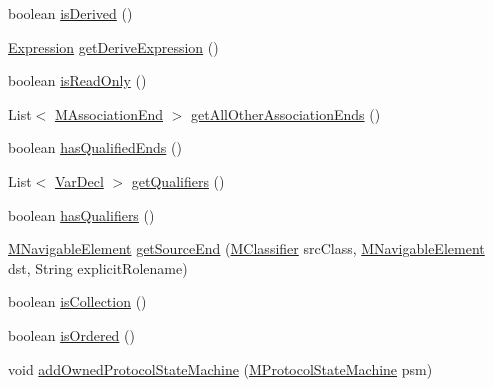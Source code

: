 \begin{DoxyCompactItemize}
boolean \hyperlink{classorg_1_1tzi_1_1use_1_1uml_1_1mm_1_1_m_association_class_impl_a62a7756bef1e61a1e354d73a60ba67e2}{is\-Derived} ()
\item 
\hyperlink{classorg_1_1tzi_1_1use_1_1uml_1_1ocl_1_1expr_1_1_expression}{Expression} \hyperlink{classorg_1_1tzi_1_1use_1_1uml_1_1mm_1_1_m_association_class_impl_adafb0cd12d54a13c79bc32deef41552b}{get\-Derive\-Expression} ()
\item 
boolean \hyperlink{classorg_1_1tzi_1_1use_1_1uml_1_1mm_1_1_m_association_class_impl_abb95bfabae3006d07e38d8c96f8c2c1b}{is\-Read\-Only} ()
\item 
List$<$ \hyperlink{classorg_1_1tzi_1_1use_1_1uml_1_1mm_1_1_m_association_end}{M\-Association\-End} $>$ \hyperlink{classorg_1_1tzi_1_1use_1_1uml_1_1mm_1_1_m_association_class_impl_a42ea6913ced3712538e8b2a394465974}{get\-All\-Other\-Association\-Ends} ()
\item 
boolean \hyperlink{classorg_1_1tzi_1_1use_1_1uml_1_1mm_1_1_m_association_class_impl_a1a1b771ccacfa96d3caedc3b2657d4b7}{has\-Qualified\-Ends} ()
\item 
List$<$ \hyperlink{classorg_1_1tzi_1_1use_1_1uml_1_1ocl_1_1expr_1_1_var_decl}{Var\-Decl} $>$ \hyperlink{classorg_1_1tzi_1_1use_1_1uml_1_1mm_1_1_m_association_class_impl_ac4306fd2aa40fe91ce981b0db0244063}{get\-Qualifiers} ()
\item 
boolean \hyperlink{classorg_1_1tzi_1_1use_1_1uml_1_1mm_1_1_m_association_class_impl_af4aa8e59c8ba007d14daa24f57d89e0f}{has\-Qualifiers} ()
\item 
\hyperlink{interfaceorg_1_1tzi_1_1use_1_1uml_1_1mm_1_1_m_navigable_element}{M\-Navigable\-Element} \hyperlink{classorg_1_1tzi_1_1use_1_1uml_1_1mm_1_1_m_association_class_impl_ab8c8a60aacc1ec2939d0cb2c7f0686a2}{get\-Source\-End} (\hyperlink{interfaceorg_1_1tzi_1_1use_1_1uml_1_1mm_1_1_m_classifier}{M\-Classifier} src\-Class, \hyperlink{interfaceorg_1_1tzi_1_1use_1_1uml_1_1mm_1_1_m_navigable_element}{M\-Navigable\-Element} dst, String explicit\-Rolename)
\item 
boolean \hyperlink{classorg_1_1tzi_1_1use_1_1uml_1_1mm_1_1_m_association_class_impl_a7af7435dc858f1eae44a57a51db016ca}{is\-Collection} ()
\item 
boolean \hyperlink{classorg_1_1tzi_1_1use_1_1uml_1_1mm_1_1_m_association_class_impl_a155e07adc539c3f02c1e5e15041142e9}{is\-Ordered} ()
\item 
void \hyperlink{classorg_1_1tzi_1_1use_1_1uml_1_1mm_1_1_m_association_class_impl_afe30c77f9b8dc030972cd51b2f1525a0}{add\-Owned\-Protocol\-State\-Machine} (\hyperlink{classorg_1_1tzi_1_1use_1_1uml_1_1mm_1_1statemachines_1_1_m_protocol_state_machine}{M\-Protocol\-State\-Machine} psm)

\end{DoxyCompactItemize}
